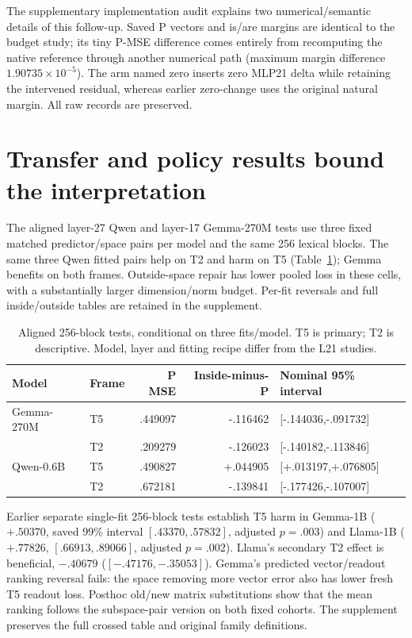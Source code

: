 \documentclass[11pt]{article}
\begin{document}
The supplementary implementation audit explains two numerical/semantic details of this follow-up. Saved P vectors and is/are margins are identical to the budget study; its tiny P-MSE difference comes entirely from recomputing the native reference through another numerical path (maximum margin difference $1.90735\times10^{-5}$). The arm named zero inserts zero MLP21 delta while retaining the intervened residual, whereas earlier zero-change uses the original natural margin. All raw records are preserved.

\section{Transfer and policy results bound the interpretation}
The aligned layer-27 Qwen and layer-17 Gemma-270M tests use three fixed matched predictor/space pairs per model and the same 256 lexical blocks. The same three Qwen fitted pairs help on T2 and harm on T5 (Table~\ref{tab:aligned}); Gemma benefits on both frames. Outside-space repair has lower pooled loss in these cells, with a substantially larger dimension/norm budget. Per-fit reversals and full inside/outside tables are retained in the supplement.

\begin{table}[ht]\centering\small
\begin{tabular}{llrrl}\toprule Model & Frame & P MSE & Inside-minus-P & Nominal 95\% interval\\\midrule
Gemma-270M & T5 & .449097 & -.116462 & [-.144036,-.091732]\\
 & T2 & .209279 & -.126023 & [-.140182,-.113846]\\
Qwen-0.6B & T5 & .490827 & +.044905 & [+.013197,+.076805]\\
 & T2 & .672181 & -.139841 & [-.177426,-.107007]\\\bottomrule\end{tabular}
\caption{Aligned 256-block tests, conditional on three fits/model. T5 is primary; T2 is descriptive. Model, layer and fitting recipe differ from the L21 studies.}\label{tab:aligned}
\end{table}

Earlier separate single-fit 256-block tests establish T5 harm in Gemma-1B ($+.50370$, saved 99\% interval $[.43370,.57832]$, adjusted $p=.003$) and Llama-1B ($+.77826$, $[.66913,.89066]$, adjusted $p=.002$). Llama's secondary T2 effect is beneficial, $-.40679$ ($[-.47176,-.35053]$). Gemma's predicted vector/readout ranking reversal fails: the space removing more vector error also has lower fresh T5 readout loss. Posthoc old/new matrix substitutions show that the mean ranking follows the subspace-pair version on both fixed cohorts. The supplement preserves the full crossed table and original family definitions.
\end{document}
